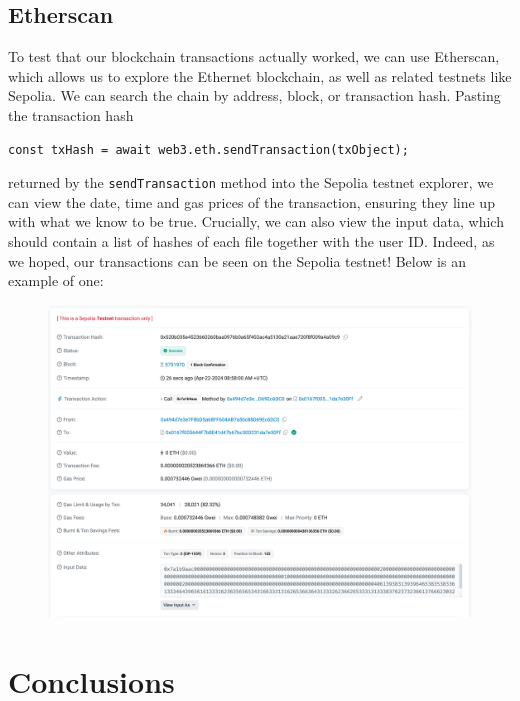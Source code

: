 \documentclass[12pt,a4paper]{article}
\begin{document}
\subsection{Etherscan}
To test that our blockchain transactions actually worked, we can use Etherscan, which allows us to explore the Ethernet blockchain, as well as related testnets like Sepolia. We can search the chain by address, block, or transaction hash. Pasting the transaction hash 
\begin{lstlisting}
const txHash = await web3.eth.sendTransaction(txObject);
\end{lstlisting}
returned by the \verb|sendTransaction| method into the Sepolia testnet explorer, we can view the date, time and gas prices of the transaction, ensuring they line up with what we know to be true. Crucially, we can also view the input data, which should contain a list of hashes of each file together with the user ID. Indeed, as we hoped, our transactions can be seen on the Sepolia testnet! Below is an example of one:
\begin{figure}[H]
    \centering
    \includegraphics[scale=0.4]{sepolia.png}
\end{figure}

\section{Conclusions}
\end{document}
